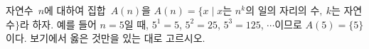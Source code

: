 자연수~$n$에 대하여 집합~$A(n)$을 $A(n)=\{x \mid x$는 $n^k$의 일의 자리의 수$,\ k$는 자연수$\}$라 하자. 예를 들어 $n=5$일 때, $5^1=5$, $5^2=25$, $5^3=125$, $\cdots$이므로 $A(5)=\{5\}$이다. 보기에서 옳은 것만을 있는 대로 고르시오. 
